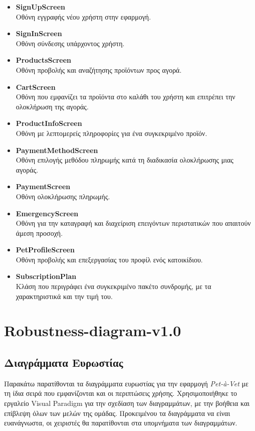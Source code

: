 \documentclass[12pt,a4paper,twoside]{book}
\begin{document}
\begin{itemize}
    \item \textbf{SignUpScreen}\\
          Οθόνη εγγραφής νέου χρήστη στην εφαρμογή.
    \item \textbf{SignInScreen}\\
          Οθόνη σύνδεσης υπάρχοντος χρήστη. %
    \item \textbf{ProductsScreen}\\
          Οθόνη προβολής και αναζήτησης προϊόντων προς αγορά.
    \item \textbf{CartScreen}\\
          Οθόνη που εμφανίζει τα προϊόντα στο καλάθι του χρήστη και επιτρέπει την ολοκλήρωση της αγοράς.
    \item \textbf{ProductInfoScreen}\\
          Οθόνη με λεπτομερείς πληροφορίες για ένα συγκεκριμένο προϊόν.
    \item \textbf{PaymentMethodScreen}\\
          Οθόνη επιλογής μεθόδου πληρωμής κατά τη διαδικασία ολοκλήρωσης μιας αγοράς. %
    \item \textbf{PaymentScreen}\\
          Οθόνη ολοκλήρωσης πληρωμής.
    \item \textbf{EmergencyScreen}\\
          Οθόνη για την καταγραφή και διαχείριση επειγόντων περιστατικών που απαιτούν άμεση προσοχή. %
    \item \textbf{PetProfileScreen}\\
          Οθόνη προβολής και επεξεργασίας του προφίλ ενός κατοικίδιου. %
    \item \textbf{SubscriptionPlan}\\
          Κλάση που περιγράφει ένα συγκεκριμένο πακέτο συνδρομής, με τα χαρακτηριστικά και την τιμή του. %
\end{itemize}

\chapter{Robustness-diagram-v1.0}

\section{Διαγράμματα Ευρωστίας}

Παρακάτω παρατίθονται τα διαγράμματα ευρωστίας για την εφαρμογή \textit{Pet-à-Vet} με τη ίδια σειρά που εμφανίζονται και οι περιπτώσεις χρήσης. Χρησιμοποιήθηκε το εργαλείο Visual Paradigm για την σχεδίαση των διαγραμμάτων, με την βοήθεια και επίβλεψη όλων των μελών της ομάδας. Προκειμένου τα διαγράμματα να είναι ευανάγνωστα, οι χειριστές θα παρατίθονται στα υπομνήματα των διαγραμμάτων. %
\end{document}
